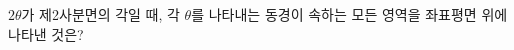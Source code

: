 $2\theta$가 제2사분면의 각일 때, 각 $\theta$를 나타내는 동경이 속하는 모든 영역을 좌표평면 위에 나타낸 것은? 
\begin{choicesii}{}{}{}{}{}\end{choicesii}
